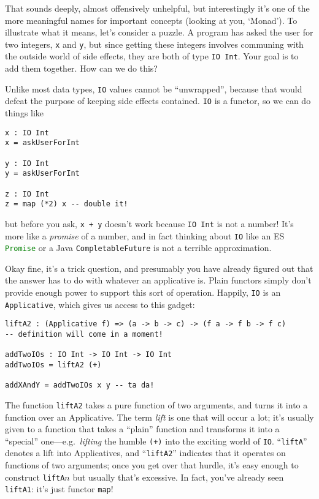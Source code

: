 \documentclass{book}
\newcommand{\mlil}[1]{\lstinline[language=pseudoml,columns=fixed]|#1|}\usepackage{caption}
\begin{document}
That sounds deeply, almost offensively unhelpful, but interestingly it's one of the more meaningful names for important concepts (looking at you, `Monad'). To illustrate what it means, let's consider a puzzle. A program has asked the user for two integers, \mlil{x} and \mlil{y}, but since getting these integers involves communing with the outside world of side effects, they are both of type \mlil{IO Int}. Your goal is to add them together. How can we do this?

Unlike most data types, \mlil{IO} values cannot be ``unwrapped'', because that would defeat the purpose of keeping side effects contained. \mlil{IO} is a functor, so we can do things like

\begin{lstlisting}[language=pseudoml]
x : IO Int
x = askUserForInt

y : IO Int
y = askUserForInt

z : IO Int
z = map (*2) x -- double it!
\end{lstlisting}

\noindent but before you ask, \mlil{x + y} doesn't work because \mlil{IO Int} is not a number! It's more like a \emph{promise} of a number, and in fact thinking about \mlil{IO} like an ES \lstinline[language=js]|Promise| or a Java \lstinline[language=java]|CompletableFuture| is not a terrible approximation.

Okay fine, it's a trick question, and presumably you have already figured out that the answer has to do with whatever an applicative is. Plain functors simply don't provide enough power to support this sort of operation. Happily, \mlil{IO} is an \mlil{Applicative}, which gives us access to this gadget:

\begin{lstlisting}[language=pseudoml]
liftA2 : (Applicative f) => (a -> b -> c) -> (f a -> f b -> f c)
-- definition will come in a moment!

addTwoIOs : IO Int -> IO Int -> IO Int
addTwoIOs = liftA2 (+)

addXAndY = addTwoIOs x y -- ta da!
\end{lstlisting}

The function \mlil{liftA2} takes a pure function of two arguments, and turns it into a function over an Applicative. The term \emph{lift} is one that will occur a lot; it's usually given to a function that takes a ``plain'' function and transforms it into a ``special'' one---e.g.\ \emph{lifting} the humble \mlil{(+)} into the exciting world of \mlil{IO}. ``\texttt{liftA}'' denotes a lift into Applicatives, and ``\texttt{liftA2}'' indicates that it operates on functions of two arguments; once you get over that hurdle, it's easy enough to construct \mlil{liftA}\( n \) but usually that's excessive. In fact, you've already seen \mlil{liftA1}: it's just functor \mlil{map}!
\end{document}
